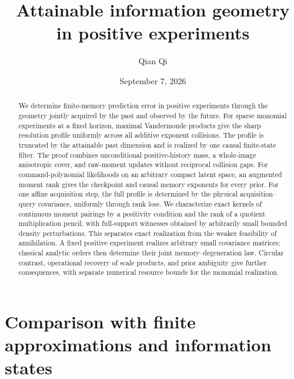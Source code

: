 \documentclass[11pt]{amsart}
\title[Attainable information geometry]{Attainable information geometry\\ in positive experiments}
\author{Qian Qi}
\date{September 7, 2026}
\theoremstyle{definition}\newtheorem{definition}[theorem]{Definition}
\theoremstyle{remark}\newtheorem{remark}[theorem]{Remark}
\begin{document}
\begin{abstract}
We determine finite-memory prediction error in positive experiments
through the geometry jointly acquired by the past and observed by the
future. For sparse monomial experiments at a fixed horizon, maximal
Vandermonde products give the sharp resolution profile uniformly across
all additive exponent collisions. The profile is truncated by the
attainable past dimension and is realized by one causal finite-state
filter. The proof combines unconditional positive-history mass, a
whole-image anisotropic cover, and raw-moment updates without reciprocal
collision gaps. For command-polynomial likelihoods on an arbitrary
compact latent space, an augmented moment rank gives the checkpoint and
causal memory exponents for every prior. For one affine acquisition
step, the full profile is determined by the physical acquisition--query
covariance, uniformly through rank loss. We characterize exact kernels
of continuous moment pairings by a positivity condition and the rank of
a quotient multiplication pencil, with full-support witnesses obtained
by arbitrarily small bounded density perturbations. This separates exact
realization from the weaker feasibility of annihilation. A fixed positive
experiment realizes arbitrary small covariance matrices; classical
analytic orders then determine their joint memory--degeneration law.
Circular contrast, operational recovery of scale products, and prior
ambiguity give further consequences, with separate numerical resource
bounds for the monomial realization.
\end{abstract}
\maketitle



















\appendix












\section{Comparison with finite approximations and information states}
\label{sec:literature-comparison}




\end{document}
